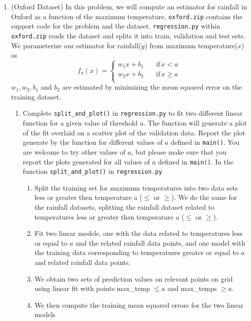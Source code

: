 \documentclass[12pt,twoside]{article}
\begin{document}
\begin{enumerate}
 \item (Oxford Dataset) In this problem, we will compute an estimator for rainfall in Oxford as a function of the maximum temperature. \verb|oxford.zip| contains the support code for the problem and the dataset. \verb|regression.py| within \verb|oxford.zip| reads the dataset and splits it into train, validation and test sets. We parameterize our estimator for rainfall($y$) from maximum temperature($x$) as 
  \begin{equation*}
f_a(x)=\begin{cases}
          w_1x + b_1 \quad &\text{if} \, x< a \\
         w_2x + b_2 &\text{if} \, x \geq a \\
     \end{cases}
 \end{equation*}
 $w_1, w_2, b_1$ and $b_2$ are estimated by minimizing the mean squared error on the training dataset. 
 \begin{enumerate}
 \item Complete \verb|split_and_plot()| in \verb|regression.py| to fit two different linear function for a given value of threshold $a$. The function will generate a plot of the fit overlaid on a scatter plot of the validation data. Report the plot generate by the function for different values of $a$ defined in \verb|main()|. You are welcome to try other values of $a$, but please make sure that you report the plots generated for all values of $a$ defined in \verb|main()|. 
	In the function  \verb|split_and_plot()| in \verb|regression.py|
	\begin{enumerate}[(1)]
		\item Split the training set for maximum temperatures into two data sets less or greater then temperature a ($\le$ or $\ge$). 
		We do the same for the rainfall datasets, splitting the rainfall dataset related to temperatures  less or greater then temperature a  ($\le$ or $\ge$). 
		\item Fit two linear models, one with the data related to temperatures less or equal to $a$ and the related rainfall data points, and one model 
		with the training data corresponding to temperatures greater or equal to $a$ and related rainfall data points. 
		\item We obtain two sets of prediction values on relevant points on grid using linear fit with points max\_temp $\le a$ and max\_temps $\ge a$.
		\item We then compute the training mean squared errors for the two linear models 

\end{enumerate}
\end{enumerate}
\end{enumerate}
\end{document}
